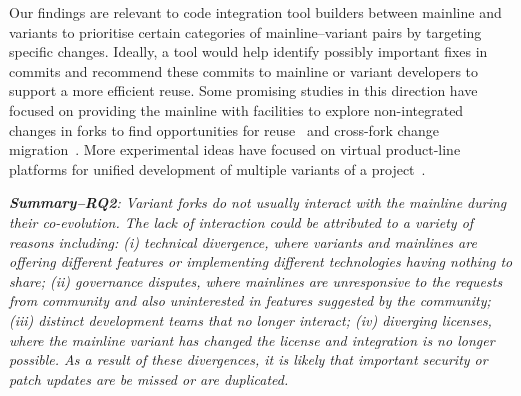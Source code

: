 Our findings are relevant to code integration tool builders between mainline and variants to prioritise certain categories of mainline--variant pairs by targeting specific changes.
Ideally, a tool would help identify possibly important fixes in commits and recommend these commits to mainline or variant developers to support a more efficient reuse.
Some promising studies in this direction have focused on providing the mainline with facilities to explore non-integrated changes in forks to find opportunities for reuse~\cite{Ren:2018} and cross-fork change migration~\cite{Ren:2019}. More experimental ideas have focused on virtual product-line platforms for unified development of multiple variants of a project~\cite{Antkiewicz:icse:2014,Fischer:saner:2014,Montalvillo:spl:2015,rubin:icse:2013,Stefan:2016:icsme}.

\begin{custombox}
\emph{\textbf{Summary--RQ2}: Variant forks do not usually interact with the mainline during their co-evolution. The lack of interaction could be attributed to a variety of reasons including: (i) technical divergence, where variants and mainlines are offering different features or implementing different technologies having nothing to share; (ii) governance disputes, where mainlines are unresponsive to the requests from community and also uninterested in features suggested by the community; (iii) distinct development teams that no longer interact; (iv) diverging licenses, where the mainline variant has changed the license and integration is no longer possible.
As a result of these divergences, it is likely that important security or patch updates are be missed or are duplicated.
}
\end{custombox}
